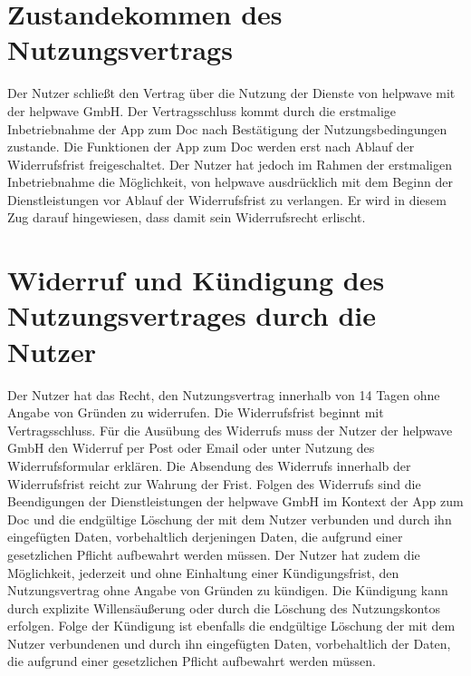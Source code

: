 \documentclass[10pt]{article}
\begin{document}
\section{Zustandekommen des Nutzungsvertrags}
Der Nutzer schließt den Vertrag über die Nutzung der Dienste von helpwave mit der helpwave GmbH. Der Vertragsschluss kommt durch die erstmalige Inbetriebnahme der App zum Doc nach Bestätigung der Nutzungsbedingungen zustande. Die Funktionen der App zum Doc werden erst nach Ablauf der Widerrufsfrist freigeschaltet. Der Nutzer hat jedoch im Rahmen der erstmaligen Inbetriebnahme die Möglichkeit, von helpwave ausdrücklich mit dem Beginn der Dienstleistungen vor Ablauf der Widerrufsfrist zu verlangen. Er wird in diesem Zug darauf hingewiesen, dass damit sein Widerrufsrecht erlischt.

\section{Widerruf und Kündigung des Nutzungsvertrages durch die Nutzer}
Der Nutzer hat das Recht, den Nutzungsvertrag innerhalb von 14 Tagen ohne Angabe von Gründen zu widerrufen. Die Widerrufsfrist beginnt mit Vertragsschluss. Für die Ausübung des Widerrufs muss der Nutzer der helpwave GmbH den Widerruf per Post oder Email oder unter Nutzung des Widerrufsformular erklären. Die Absendung des Widerrufs innerhalb der Widerrufsfrist reicht zur Wahrung der Frist. Folgen des Widerrufs sind die Beendigungen der Dienstleistungen der helpwave GmbH im Kontext der App zum Doc und die endgültige Löschung der mit dem Nutzer verbunden und durch ihn eingefügten Daten, vorbehaltlich derjeningen Daten, die aufgrund einer gesetzlichen Pflicht aufbewahrt werden müssen.
Der Nutzer hat zudem die Möglichkeit, jederzeit und ohne Einhaltung einer Kündigungsfrist, den Nutzungsvertrag ohne Angabe von Gründen zu kündigen. Die Kündigung kann durch explizite Willensäußerung oder durch die Löschung des Nutzungskontos erfolgen. Folge der Kündigung ist ebenfalls die endgültige Löschung der mit dem Nutzer verbundenen und durch ihn eingefügten Daten, vorbehaltlich der Daten, die aufgrund einer gesetzlichen Pflicht aufbewahrt werden müssen.
\end{document}
